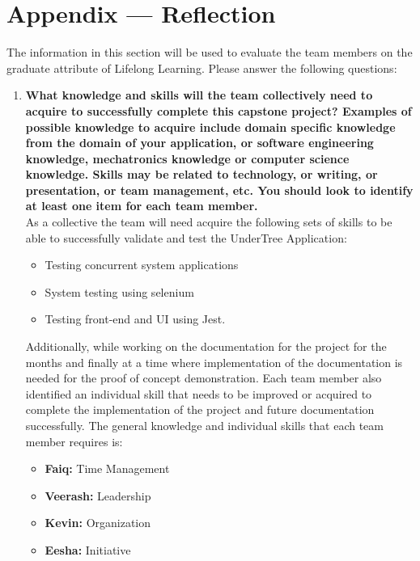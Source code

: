 \documentclass[12pt, titlepage]{article}
\begin{document}
	
	
	\newpage{}
	\section*{Appendix --- Reflection}
	
	The information in this section will be used to evaluate the team members on the
	graduate attribute of Lifelong Learning.  Please answer the following questions:
	
	\begin{enumerate}
		\item \textbf{What knowledge and skills will the team collectively need to acquire to
			successfully complete this capstone project?  Examples of possible knowledge
			to acquire include domain specific knowledge from the domain of your
			application, or software engineering knowledge, mechatronics knowledge or
			computer science knowledge.  Skills may be related to technology, or writing,
			or presentation, or team management, etc.  You should look to identify at
			least one item for each team member.}\\
		
		As a collective the team will need acquire the following sets of skills to be able to successfully validate and test the UnderTree Application:
		\begin{itemize}
			\item Testing concurrent system applications
			\item System testing using selenium
			\item Testing front-end and UI using Jest.
		\end{itemize}
		
		Additionally, while working on the documentation for the project for the months and finally at a time where implementation of the documentation is needed for the proof of concept demonstration. Each team member also identified an individual skill that needs to be improved or acquired to complete the implementation of the project and future documentation successfully. The general knowledge and individual skills that each team member requires is:
		
		\begin{itemize}
			\item \textbf{Faiq:} Time Management
			\item \textbf{Veerash:} Leadership
			\item \textbf{Kevin:} Organization
			\item \textbf{Eesha:} Initiative
		\end{itemize}
		

\end{enumerate}
\end{document}

